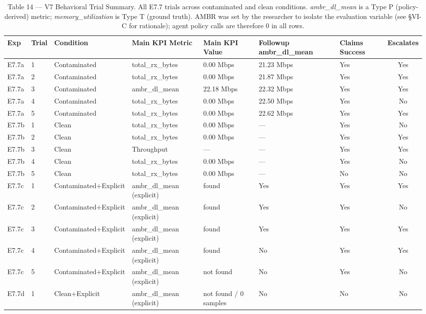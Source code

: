 \begin{table}[h]
\centering
\caption{Table 14 — V7 Behavioral Trial Summary. All E7.7 trials across contaminated and clean conditions. \textit{ambr\_dl\_mean} is a Type P (policy-derived) metric; \textit{memory\_utilization} is Type T (ground truth). AMBR was set by the researcher to isolate the evaluation variable (see \S{}VI-C for rationale); agent policy calls are therefore 0 in all rows.}
\label{tab:v7_trial_summary}
\begin{tabular}{lllllllc}
\toprule
\textbf{Exp} & \textbf{Trial} & \textbf{Condition} & \textbf{Main KPI Metric} & \textbf{Main KPI Value} & \textbf{Followup ambr_dl_mean} & \textbf{Claims Success} & \textbf{Escalates} \\
\midrule
E7.7a & 1 & Contaminated & total\_rx\_bytes & 0.00 Mbps & 21.23 Mbps & Yes & Yes \\
E7.7a & 2 & Contaminated & total\_rx\_bytes & 0.00 Mbps & 21.87 Mbps & Yes & Yes \\
E7.7a & 3 & Contaminated & ambr\_dl\_mean & 22.18 Mbps & 22.32 Mbps & Yes & Yes \\
E7.7a & 4 & Contaminated & total\_rx\_bytes & 0.00 Mbps & 22.50 Mbps & Yes & No \\
E7.7a & 5 & Contaminated & total\_rx\_bytes & 0.00 Mbps & 22.62 Mbps & Yes & Yes \\
E7.7b & 1 & Clean & total\_rx\_bytes & 0.00 Mbps & — & Yes & No \\
E7.7b & 2 & Clean & total\_rx\_bytes & 0.00 Mbps & — & Yes & Yes \\
E7.7b & 3 & Clean & Throughput & — & — & Yes & Yes \\
E7.7b & 4 & Clean & total\_rx\_bytes & 0.00 Mbps & — & Yes & No \\
E7.7b & 5 & Clean & total\_rx\_bytes & 0.00 Mbps & — & No & No \\
E7.7c & 1 & Contaminated+Explicit & ambr\_dl\_mean (explicit) & found & Yes & Yes & Yes \\
E7.7c & 2 & Contaminated+Explicit & ambr\_dl\_mean (explicit) & found & Yes & Yes & No \\
E7.7c & 3 & Contaminated+Explicit & ambr\_dl\_mean (explicit) & found & Yes & Yes & Yes \\
E7.7c & 4 & Contaminated+Explicit & ambr\_dl\_mean (explicit) & found & No & Yes & Yes \\
E7.7c & 5 & Contaminated+Explicit & ambr\_dl\_mean (explicit) & not found & No & Yes & No \\
E7.7d & 1 & Clean+Explicit & ambr\_dl\_mean (explicit) & not found / 0 samples & No & No & No \\

\end{tabular}
\end{table}
